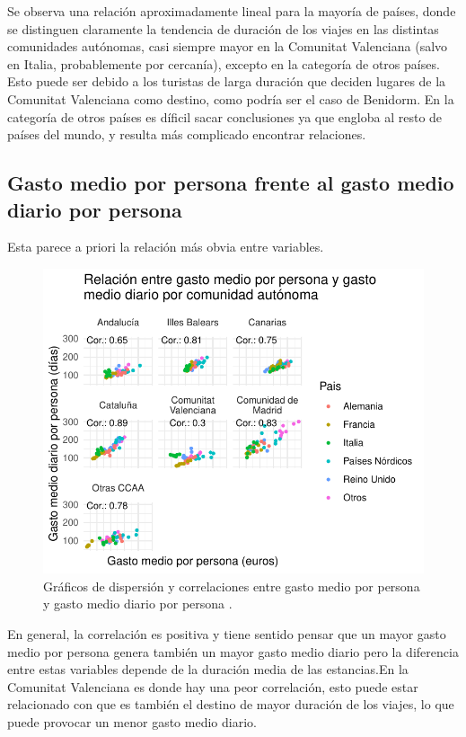 \documentclass[data,article,submit,moreauthors,pdftex]{Definitions/mdpi}
\begin{document}
Se observa una relación aproximadamente lineal para la mayoría de
países, donde se distinguen claramente la tendencia de duración de los
viajes en las distintas comunidades autónomas, casi siempre mayor en la
Comunitat Valenciana (salvo en Italia, probablemente por cercanía),
excepto en la categoría de otros países. Esto puede ser debido a los
turistas de larga duración que deciden lugares de la Comunitat
Valenciana como destino, como podría ser el caso de Benidorm. En la
categoría de otros países es díficil sacar conclusiones ya que engloba
al resto de países del mundo, y resulta más complicado encontrar
relaciones.

\hypertarget{gasto-medio-por-persona-frente-al-gasto-medio-diario-por-persona}{%
\subsection{Gasto medio por persona frente al gasto medio diario por
persona}\label{gasto-medio-por-persona-frente-al-gasto-medio-diario-por-persona}}

Esta parece a priori la relación más obvia entre variables.

\begin{figure}[H]
\includegraphics{ProyectoAED2024_Rmd_files/figure-latex/unnamed-chunk-33-1} \caption{Gráficos de dispersión y correlaciones entre gasto medio por persona y gasto medio diario por persona .\label{fig:gastomediovsgastomediodiario}}\label{fig:unnamed-chunk-33}
\end{figure}

En general, la correlación es positiva y tiene sentido pensar que un
mayor gasto medio por persona genera también un mayor gasto medio diario
pero la diferencia entre estas variables depende de la duración media de
las estancias.En la Comunitat Valenciana es donde hay una peor
correlación, esto puede estar relacionado con que es también el destino
de mayor duración de los viajes, lo que puede provocar un menor gasto
medio diario.
\end{document}
